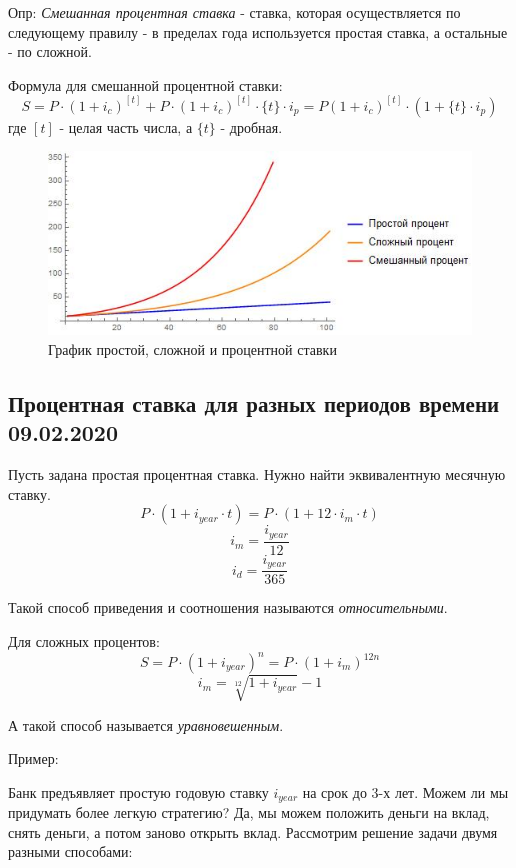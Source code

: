 \documentclass[aps,%
12pt,%
final,%
oneside,
onecolumn,%
musixtex, %
superscriptaddress,%
centertags]{article} %
\begin{document}
Опр: \textit{Смешанная процентная ставка} - ставка, которая осуществляется по следующему правилу - в пределах года используется простая ставка, а остальные - по сложной.

Формула для смешанной процентной ставки:
$$S = P\cdot (1+i_c)^{[t]} + P\cdot (1+i_c)^{[t]} \cdot {\{t\}}\cdot i_p = P(1+i_c)^{[t]} \cdot (1 + {\{t\}}\cdot i_p ) $$
где ${[t]}$ - целая часть числа, а  ${\{t\}}$ - дробная.
\begin{figure}[h!]
	
	\begin{center}
	\includegraphics[scale=0.6]{images/first.jpg}
	\caption{График простой, сложной и процентной ставки}
	\end{center}
\end{figure}
\newpage


\subsection{Процентная ставка для разных периодов времени 09.02.2020 }

Пусть задана простая процентная ставка. Нужно найти эквивалентную месячную ставку.
$$ P\cdot (1+i_{year} \cdot t) = P \cdot (1+12 \cdot i_{m}\cdot t) $$
$$i_{m} = \frac{i_{year}}{12} $$
$$i_{d} = \frac{i_{year}}{365} $$

Такой способ приведения и соотношения называются \textit{относительными}.

Для сложных процентов:
$$ S = P\cdot (1+i_{year})^n  = P\cdot (1+i_{m})^{12n} $$
$$ i_{m} = \sqrt[12]{1 + i_{year}} - 1 $$

А такой способ называется \textit{уравновешенным}.

Пример:

Банк предъявляет простую годовую ставку $i_{year}$ на срок до $3$-х лет. Можем ли мы придумать более легкую стратегию? Да, мы можем положить деньги на вклад, снять деньги, а потом заново открыть вклад. Рассмотрим решение задачи двумя разными способами:
\end{document}
